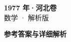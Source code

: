 \documentclass[zihao=-4, a4paper]{ctexart}
\begin{document}
\begin{center}
  {\Large\bfseries 1977 年·河北卷}\\[4pt]
  {\large 数学 · 解析版}
\end{center}
\medskip
{}

\clearpage
{}
\begin{center}{\Large\bfseries 参考答案与详细解析}\end{center}
\medskip

\end{document}
